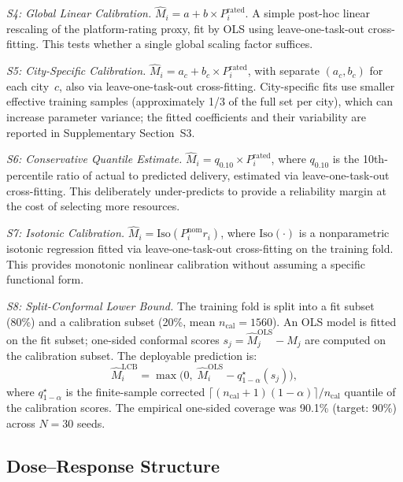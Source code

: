 \documentclass[utf8]{FrontiersinHarvard}
\newcommand{\Mhat}{\widehat{M}}
\begin{document}
\textit{S4: Global Linear Calibration.}
$\Mhat_i = a + b \times $$P_i^{\mathrm{rated}}$. A simple
post-hoc linear rescaling of the platform-rating proxy, fit by OLS
using leave-one-task-out cross-fitting. This tests whether a
single global scaling factor suffices.

\textit{S5: City-Specific Calibration.}
$\Mhat_i = a_c + b_c \times P_i^{\mathrm{rated}}$, with
separate $(a_c, b_c)$ for each city~$c$, also via
leave-one-task-out cross-fitting. City-specific fits use
smaller effective training samples (approximately 1/3 of the
full set per city), which can increase parameter variance;
the fitted coefficients and their variability are reported in
Supplementary Section~S3.

\textit{S6: Conservative Quantile Estimate.}
$\Mhat_i = q_{0.10} \times $$P_i^{\mathrm{rated}}$, where
$q_{0.10}$ is the 10th-percentile ratio of actual to predicted
delivery, estimated via leave-one-task-out cross-fitting.
This deliberately under-predicts to provide a reliability
margin at the cost of selecting more resources.

\textit{S7: Isotonic Calibration.}
$\Mhat_i = \mathrm{Iso}(P_i^{\mathrm{nom}} r_i)$, where
$\mathrm{Iso}(\cdot)$ is a nonparametric isotonic regression
fitted via leave-one-task-out cross-fitting on the training
fold. This provides monotonic nonlinear calibration without
assuming a specific functional form.

\textit{S8: Split-Conformal Lower Bound.}
The training fold is split into a fit subset (80\%) and a
calibration subset (20\%, mean $n_{\mathrm{cal}} = 1560$).
An OLS model is fitted on the fit subset; one-sided
conformal scores $s_j = \hat{M}_j^{\mathrm{OLS}} - M_j$ are
computed on the calibration subset. The deployable prediction
is:
\begin{equation}
    \Mhat_i^{\mathrm{LCB}} = \max\!\bigl(0,\;
    \hat{M}_i^{\mathrm{OLS}} - q_{1-\alpha}^{\star}(s_j)\bigr),
\end{equation}
where $q_{1-\alpha}^{\star}$ is the finite-sample corrected
$\lceil(n_{\mathrm{cal}}+1)(1-\alpha)\rceil/n_{\mathrm{cal}}$
quantile of the calibration scores. The empirical one-sided
coverage was 90.1\% (target: 90\%) across $N=30$ seeds.

\subsection{Dose--Response Structure}
\label{subsec:dose_response}
\end{document}
